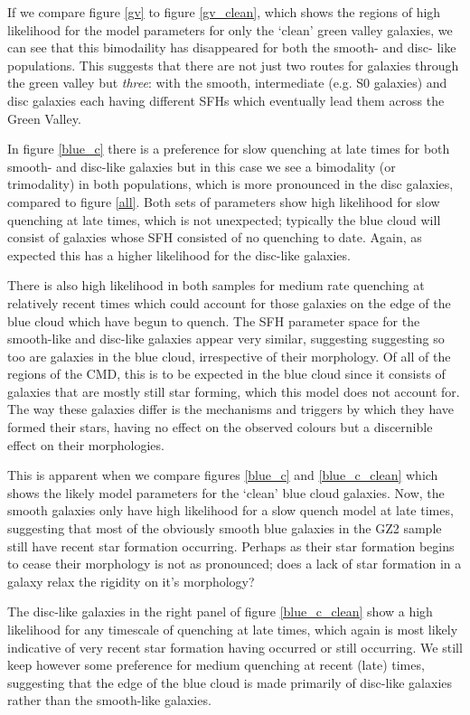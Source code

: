 \documentclass{mn2e}
\begin{document}
If we compare figure \ref{gv} to figure \ref{gv_clean}, which shows the regions of high likelihood for the model parameters for only the `clean' green valley galaxies, we can see that this bimodaility has disappeared for both the smooth- and disc- like populations. This suggests that there are not just two routes for galaxies through the green valley but \emph{three}: with the smooth, intermediate (e.g. S0 galaxies) and disc galaxies each having different SFHs which eventually lead them across the Green Valley.


In figure \ref{blue_c} there is a preference for slow quenching at late times for both smooth- and disc-like galaxies but in this case we see a bimodality (or trimodality) in both populations, which is more pronounced in the disc galaxies, compared to figure \ref{all}. Both sets of parameters show high likelihood for slow quenching at late times, which is not unexpected; typically the blue cloud will consist of galaxies whose SFH consisted of no quenching to date. Again, as expected this has a higher likelihood for the disc-like galaxies. 

There is also high likelihood in both samples for medium rate quenching at relatively recent times which could account for those galaxies on the edge of the blue cloud which have begun to quench. The SFH parameter space for the smooth-like and disc-like galaxies appear very similar, suggesting suggesting so too are galaxies in the blue cloud, irrespective of their morphology. Of all of the regions of the CMD, this is to be expected in the blue cloud since it consists of galaxies that are mostly still star forming, which this model does not account for. The way these galaxies differ is the mechanisms and triggers by which they have formed their stars, having no effect on the observed colours but a discernible effect on their morphologies.

This is apparent when we compare figures \ref{blue_c} and \ref{blue_c_clean} which shows the likely model parameters for the `clean' blue cloud galaxies. Now, the smooth galaxies only have high likelihood for a slow quench model at late times, suggesting that most of the obviously smooth blue galaxies in the GZ2 sample still have recent star formation occurring. Perhaps as their star formation begins to cease their morphology is not as pronounced; does a lack of star formation in a galaxy relax the rigidity on it's morphology?

The disc-like galaxies in the right panel of figure \ref{blue_c_clean} show a high likelihood for any timescale of quenching at late times, which again is most likely indicative of very recent star formation having occurred or still occurring. We still keep however some preference for medium quenching at recent (late) times, suggesting that the edge of the blue cloud is made primarily of disc-like galaxies rather than the smooth-like galaxies. 
\end{document}
